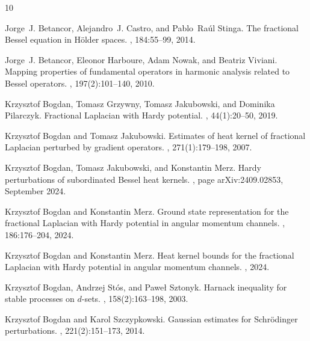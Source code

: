 \documentclass[12pt,reqno,a4paper]{amsart}
\theoremstyle{definition}
\theoremstyle{remark}
\numberwithin{equation}{section}
\newcommand{\1}{\mathbbm{1}}
\begin{document}
% 
% 

\def\cprime{$'$}
\begin{thebibliography}{10}

Jorge~J. Betancor, Alejandro~J. Castro, and Pablo~Ra\'{u}l Stinga.
\newblock The fractional {B}essel equation in {H}\"{o}lder spaces.
, 184:55--99, 2014.

Jorge~J. Betancor, Eleonor Harboure, Adam Nowak, and Beatriz Viviani.
\newblock Mapping properties of fundamental operators in harmonic analysis
  related to {B}essel operators.
, 197(2):101--140, 2010.

Krzysztof Bogdan, Tomasz Grzywny, Tomasz Jakubowski, and Dominika Pilarczyk.
\newblock Fractional {L}aplacian with {H}ardy potential.
, 44(1):20--50, 2019.

Krzysztof Bogdan and Tomasz Jakubowski.
\newblock Estimates of heat kernel of fractional {L}aplacian perturbed by
  gradient operators.
, 271(1):179--198, 2007.

Krzysztof {Bogdan}, Tomasz {Jakubowski}, and Konstantin {Merz}.
\newblock Hardy perturbations of subordinated {B}essel heat kernels.
, page arXiv:2409.02853, September 2024.

Krzysztof Bogdan and Konstantin Merz.
\newblock Ground state representation for the fractional {L}aplacian with
  {H}ardy potential in angular momentum channels.
, 186:176--204, 2024.

Krzysztof Bogdan and Konstantin Merz.
\newblock Heat kernel bounds for the fractional {L}aplacian with {H}ardy
  potential in angular momentum channels.
, 2024.

Krzysztof Bogdan, Andrzej St\'{o}s, and Pawe{\l} Sztonyk.
\newblock Harnack inequality for stable processes on {$d$}-sets.
, 158(2):163--198, 2003.

Krzysztof Bogdan and Karol Szczypkowski.
\newblock Gaussian estimates for {S}chr\"{o}dinger perturbations.
, 221(2):151--173, 2014.


\end{thebibliography}
\end{document}
